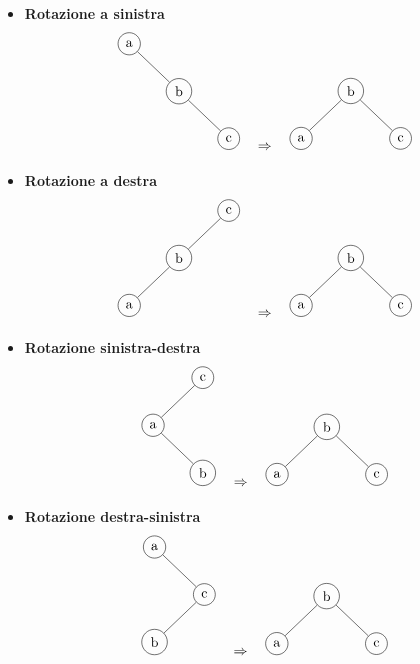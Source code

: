 \documentclass[10pt]{extarticle}
\begin{document}
\begin{itemize}
  \item \textbf{Rotazione a sinistra}
  \[
  \begin{tikzpicture}[level distance=1.2cm,
    level 1/.style={sibling distance=2.5cm},
    every node/.style={circle,draw}]
  \node {a}
    child[missing]
    child {node {b}
      child[missing]
      child {node {c}}};
  \end{tikzpicture}
  \quad \Rightarrow \quad
  \begin{tikzpicture}[level distance=1.2cm,
    level 1/.style={sibling distance=2.5cm},
    every node/.style={circle,draw}]
  \node {b}
    child {node {a}}
    child {node {c}};
  \end{tikzpicture}
  \]

  \item \textbf{Rotazione a destra}
  \[
  \begin{tikzpicture}[level distance=1.2cm,
    level 1/.style={sibling distance=2.5cm},
    every node/.style={circle,draw}]
  \node {c}
    child {node {b}
      child {node {a}}
      child[missing]}
    child[missing];
  \end{tikzpicture}
  \quad \Rightarrow \quad
  \begin{tikzpicture}[level distance=1.2cm,
    level 1/.style={sibling distance=2.5cm},
    every node/.style={circle,draw}]
  \node {b}
    child {node {a}}
    child {node {c}};
  \end{tikzpicture}
  \]

  \item \textbf{Rotazione sinistra-destra}
  \[
  \begin{tikzpicture}[level distance=1.2cm,
    level 1/.style={sibling distance=2.5cm},
    every node/.style={circle,draw}]
  \node {c}
    child {node {a}
      child[missing]
      child {node {b}}}
    child[missing];
  \end{tikzpicture}
  \quad \Rightarrow \quad
  \begin{tikzpicture}[level distance=1.2cm,
    level 1/.style={sibling distance=2.5cm},
    every node/.style={circle,draw}]
  \node {b}
    child {node {a}}
    child {node {c}};
  \end{tikzpicture}
  \]

  \item \textbf{Rotazione destra-sinistra}
  \[
  \begin{tikzpicture}[level distance=1.2cm,
    level 1/.style={sibling distance=2.5cm},
    every node/.style={circle,draw}]
  \node {a}
    child[missing]
    child {node {c}
      child {node {b}}
      child[missing]};
  \end{tikzpicture}
  \quad \Rightarrow \quad
  \begin{tikzpicture}[level distance=1.2cm,
    level 1/.style={sibling distance=2.5cm},
    every node/.style={circle,draw}]
  \node {b}
    child {node {a}}
    child {node {c}};
  \end{tikzpicture}
  \]
\end{itemize}
\end{document}
